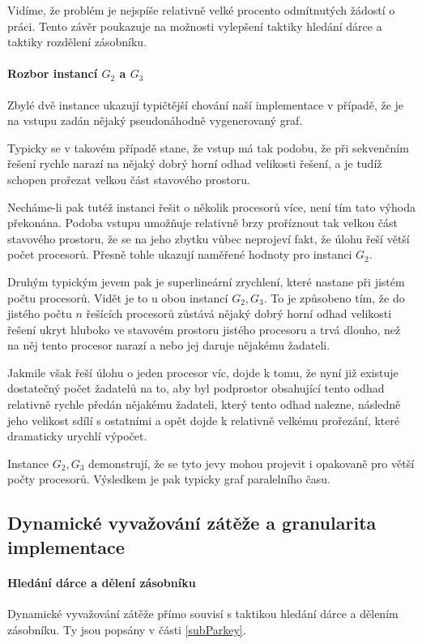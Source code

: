 \documentclass[12pt]{article}
\theoremstyle{definition}
\begin{document}
Vidíme, že problém je nejspíše relativně velké procento odmítnutých žádostí o práci. Tento závěr poukazuje na
možnosti vylepšení taktiky hledání dárce a taktiky rozdělení zásobníku.
\paragraph{Rozbor instancí $G_2$ a $G_3$}\mbox{}\newline
Zbylé dvě instance ukazují typičtější chování naší implementace v případě, že je na vstupu
zadán nějaký pseudonáhodně vygenerovaný graf.

Typicky se v takovém případě stane, že vstup má tak  podobu, že při sekvenčním řešení
rychle narazí na nějaký dobrý horní odhad velikosti řešení, a je tudíž schopen prořezat velkou část stavového prostoru.

Necháme-li pak tutéž instanci řešit o několik procesorů více, není tím tato výhoda překonána. Podoba vstupu umožňuje
relativně brzy proříznout tak velkou část stavového prostoru, že se na jeho zbytku vůbec neprojeví fakt, že úlohu řeší
větší počet procesorů. Přesně tohle ukazují naměřené hodnoty pro instanci $G_2$.

Druhým typickým jevem pak je superlineární zrychlení, které  nastane při jistém počtu procesorů. Vidět je to
u obou instancí $G_2, G_3$. To je způsobeno tím, že do jistého počtu $n$ řešících procesorů zůstává nějaký
dobrý horní odhad velikosti řešení ukryt hluboko ve stavovém prostoru jistého procesoru a trvá dlouho, než na něj tento procesor narazí a nebo
jej daruje nějakému žadateli.

Jakmile však řeší úlohu o jeden procesor víc, dojde k tomu, že nyní již existuje dostatečný počet žadatelů na to, aby
byl podprostor obsahující tento odhad relativně rychle předán nějakému žadateli, který tento odhad nalezne, následně jeho velikost
sdílí s ostatními a opět dojde k relativně velkému prořezání, které dramaticky urychlí výpočet.

Instance $G_2, G_3$ demonstrují, že se tyto jevy mohou projevit i opakovaně pro větší počty procesorů. Výsledkem je pak
typicky  graf paralelního času.
\subsection{Dynamické vyvažování zátěže a granularita implementace}
\paragraph{Hledání dárce a dělení zásobníku}\mbox{}\newline
Dynamické vyvažování zátěže přímo souvisí s taktikou hledání dárce a dělením zásobníku. Ty jsou
popsány v části \ref{subParkey}.
\end{document}
